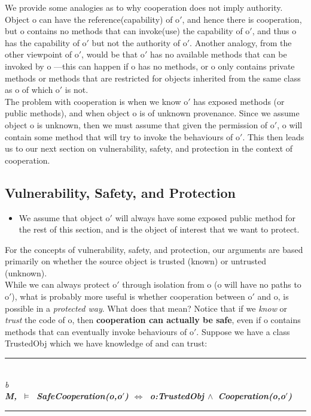\documentclass[a4paper,11pt,twoside]{article}
\makeatletter
\newenvironment{logic}
{\begin{minipage}[c]{\linewidth}  \sffamily \mdseries \begin{tabbing}}
{\end{tabbing}\end{minipage}\vspace{0.3em}}
\newcommand{\loand}{$\land$}
\newcommand{\losigma}{\text{$\upsigma$}}
\newcommand{\loturns} {$\vDash$}
\newcommand{\loiff} {$\iff$}
\newcommand{\hr}{\rule{\linewidth}{0.4pt}}
\DeclareRobustCommand{\emp}{%
  \@nomath\em \if b\expandafter\@car\f@series\@nil
  \normalfont \else \sffamily \bfseries \fi}
\makeatother
\begin{document}
We provide some analogies as to why cooperation does not imply authority. Object o can have the reference(capability) of o$'$, and hence there is cooperation, but o contains no methods that can invoke(use) the capability of o$'$, and thus o has the capability of o$'$ but not the authority of o$'$. Another analogy, from the other viewpoint of o$'$, would be that o$'$ has no available methods that can be invoked by o ---this can happen if o has no methods, or o only contains private methods or methods that are restricted for objects inherited from the same class as o of which o$'$ is not.\\

The problem with cooperation is when we know o$'$ has exposed methods (or public methods), and when object o is of unknown provenance. Since we assume object o is unknown, then we must assume that given the permission of o$'$, o will contain some method that will try to invoke the behaviours of o$'$. This then leads us to our next section on vulnerability, safety, and protection in the context of cooperation.

\subsection{Vulnerability, Safety, and Protection}\label{sec:vulnerability and protection}
\begin{itemize}\item We assume that object o$'$ will always have some exposed public method for the rest of this section, and is the object of interest that we want to protect.\end{itemize}
For the concepts of vulnerability, safety, and protection, our arguments are based primarily on whether the source object is trusted (known) or untrusted (unknown).\\

While we can always protect o$'$ through isolation from o (o will have no paths to o$'$), what is probably more useful is whether cooperation between o$'$ and o, is possible in a \textit{protected way}. What does that mean? Notice that if we \textit{know} or \textit{trust} the code of o, then \textbf{cooperation can actually be safe}, even if o contains methods that can eventually invoke behaviours of o$'$. Suppose we have a class TrustedObj which we have knowledge of and can trust:\\

\begin{logic}
\hr\\
\emp{Definition---[Safe cooperation]}\\
M,\losigma\ \loturns\ SafeCooperation(o,o$'$) \loiff\ o:TrustedObj \loand\ Cooperation(o,o$'$)\\
\hr
\end{logic}
\end{document}
